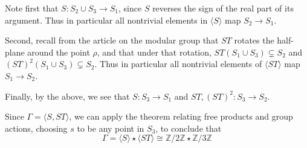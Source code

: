 \documentclass[12pt]{article}
\newcommand{\Ints}{\mathbb{Z}}
\begin{document}
Note first that $S:S_2\cup S_3\to S_1$, since $S$ reverses the sign of the real part of its argument. Thus in particular all nontrivial elements in $\langle S\rangle$ map $S_2\to S_1$.

Second, recall from the article on the modular group that $ST$ rotates the half-plane around the point $\rho$, and that under that rotation, $ST(S_1\cup S_3)\subsetneq S_2$ and $(ST)^2(S_1\cup S_3)\subsetneq S_2$. Thus in particular all nontrivial elements of $\langle ST\rangle$ map $S_1\to S_2$.

Finally, by the above, we see that $S:S_3\to S_1$ and $ST, (ST)^2:S_3\to S_2$.

Since $\Gamma=\langle S,ST\rangle$, we can apply the theorem relating free products and group actions, choosing $s$ to be any point in $S_3$, to conclude that
\[\Gamma =\langle S\rangle \star \langle ST\rangle\cong \Ints/2\Ints \star \Ints/3\Ints\]
\end{document}
